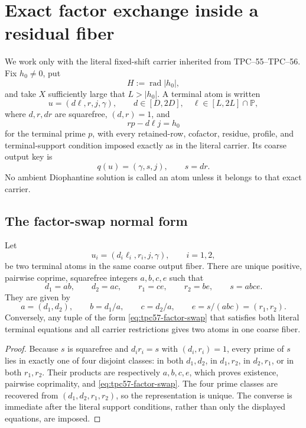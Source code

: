 \section{Exact factor exchange inside a residual fiber}
\label{sec:tpc57-factor-exchange}

We work only with the literal fixed-shift carrier inherited from
TPC--55--TPC--56.  Fix \(h_0\ne0\), put
\[
 H:=\operatorname{rad}|h_0|,
\]
and take \(X\) sufficiently large that \(L>|h_0|\).  A terminal atom is
written
\[
 u=(d\ell,r,j,\gamma),
 \qquad
 d\in[D,2D],\quad \ell\in[L,2L]\cap\mathbb P,
\]
where \(d,r,dr\) are squarefree, \((d,r)=1\), and
\begin{equation}
 rp-d\ell j=h_0
 \label{eq:tpc57-terminal-equation}
\end{equation}
for the terminal prime \(p\), with every retained-row, cofactor, residue,
profile, and terminal-support condition imposed exactly as in the literal
carrier.  Its coarse output key is
\[
 q(u)=(\gamma,s,j),\qquad s=dr.
\]
No ambient Diophantine solution is called an atom unless it belongs to
that exact carrier.

\subsection{The factor-swap normal form}

\begin{proposition}
\label{prop:tpc57-factor-exchange}
Let
\[
 u_i=(d_i\ell_i,r_i,j,\gamma),\qquad i=1,2,
\]
be two terminal atoms in the same coarse output fiber.  There are unique
positive, pairwise coprime, squarefree integers \(a,b,c,e\) such that
\begin{equation}
 \boxed{
 d_1=ab,\qquad d_2=ac,\qquad
 r_1=ce,\qquad r_2=be,
 \qquad s=abce.}
 \label{eq:tpc57-factor-swap}
\end{equation}
They are given by
\begin{equation}
 a=(d_1,d_2),\qquad
 b=d_1/a,\qquad c=d_2/a,
 \qquad e=s/(abc)=(r_1,r_2).
 \label{eq:tpc57-factor-swap-parameters}
\end{equation}
Conversely, any tuple of the form
\eqref{eq:tpc57-factor-swap} that satisfies both literal terminal
equations and all carrier restrictions gives two atoms in one coarse
fiber.
\end{proposition}

\begin{proof}
Because \(s\) is squarefree and \(d_i r_i=s\) with
\((d_i,r_i)=1\), every prime of \(s\) lies in exactly one of four
disjoint classes: in both \(d_1,d_2\), in \(d_1,r_2\), in
\(d_2,r_1\), or in both \(r_1,r_2\).  Their products are respectively
\(a,b,c,e\), which proves existence, pairwise coprimality, and
\eqref{eq:tpc57-factor-swap}.  The four prime classes are recovered from
\((d_1,d_2,r_1,r_2)\), so the representation is unique.  The converse is
immediate after the literal support conditions, rather than only the
displayed equations, are imposed.
\end{proof}

